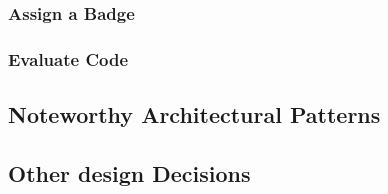 \subsubsection{Assign a Badge}
\subsubsection{Evaluate Code}
\subsection{Noteworthy Architectural Patterns}
\subsection{Other design Decisions}